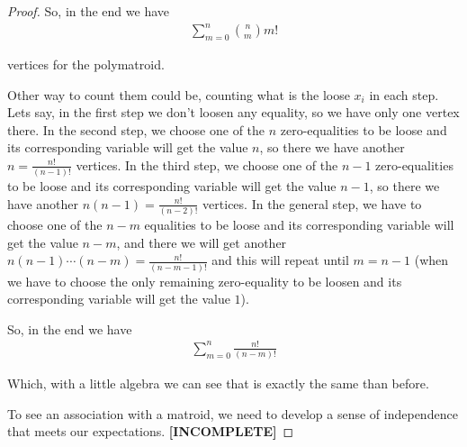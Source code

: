 \begin{proof}
        So, in the end we have
        \begin{align}
                \sum_{m = 0}^n \binom{n}{m} m!
        \end{align}
        
        vertices for the polymatroid.\pn
        
        Other way to count them could be, counting what is the loose $x_i$ in each step. Lets say, in the first step we don't loosen any equality, so 
        we have only one vertex there. In the second step, we choose one of the $n$ zero-equalities to be loose and its corresponding variable will get the value $n$, 
        so there we have another $n = \frac{n!}{(n-1)!}$ vertices. In the third step, we choose one of the $n-1$ zero-equalities to be loose and its corresponding
        variable will get the value $n-1$, so there we have another $n (n-1) = \frac{n!}{(n-2)!}$ vertices. In the general step, we have to choose one of the $n-m$ 
        equalities to be loose and its corresponding variable will get the value $n-m$, and there we will get another $n (n-1) \cdots (n-m) = \frac{n!}{(n-m-1)!}$ and 
        this will repeat until $m = n-1$ (when we have to choose the only remaining zero-equality to be loosen and its corresponding variable will get the value $1$).\pn
        
        So, in the end we have
        \begin{align}
                \sum_{m = 0}^{n} \frac{n!}{(n-m)!}
        \end{align}
        
        Which, with a little algebra we can see that is exactly the same than before.\pn
        
        To see an association with a matroid, we need to develop a sense of independence that meets our expectations.
        \textbf{[INCOMPLETE]}
    \end{proof}